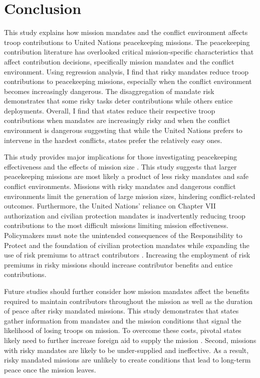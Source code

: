 \documentclass[12pt]{article}
\begin{document}
\section*{Conclusion}

This study explains how mission mandates and the conflict environment affects troop contributions to United Nations peacekeeping missions. The peacekeeping contribution literature has overlooked critical mission-specific characteristics that affect contribution decisions, specifically mission mandates and the conflict environment. Using regression analysis, I find that risky mandates reduce troop contributions to peacekeeping missions, especially when the conflict environment becomes increasingly dangerous. The disaggregation of mandate risk demonstrates that some risky tasks deter contributions while others entice deployments. Overall, I find that states reduce their respective troop contributions when mandates are increasingly risky and when the conflict environment is dangerous suggesting that while the United Nations prefers to intervene in the hardest conflicts, states prefer the relatively easy ones.  

This study provides major implications for those investigating peacekeeping effectiveness and the effects of mission size \citep[Ex.][]{hultman2013united,fjelde2019,phayal2020}. This study suggests that larger peacekeeping missions are most likely a product of less risky mandates and safe conflict environments. Missions with risky mandates and dangerous conflict environments limit the generation of large mission sizes, hindering conflict-related outcomes. Furthermore, the United Nations' reliance on Chapter VII authorization and civilian protection mandates \citep{Prot_Civs} is inadvertently reducing troop contributions to the most difficult missions limiting mission effectiveness. Policymakers must note the unintended consequences of the Responsibility to Protect and the foundation of civilian protection mandates while expanding the use of risk premiums to attract contributors \citep{razza_2020}. Increasing the employment of risk premiums in risky missions should increase contributor benefits and entice contributions. 

Future studies should further consider how mission mandates affect the benefits required to maintain contributors throughout the mission as well as the duration of peace after risky mandated missions. This study demonstrates that states gather information from mandates and the mission conditions that signal the likelihood of losing troops on mission. To overcome these costs, pivotal states likely need to further increase foreign aid to supply the mission \citep{boutton2020}. Second, missions with risky mandates are likely to be under-supplied and ineffective. As a result, risky mandated missions are unlikely to create conditions that lead to long-term peace once the mission leaves.
\end{document}
